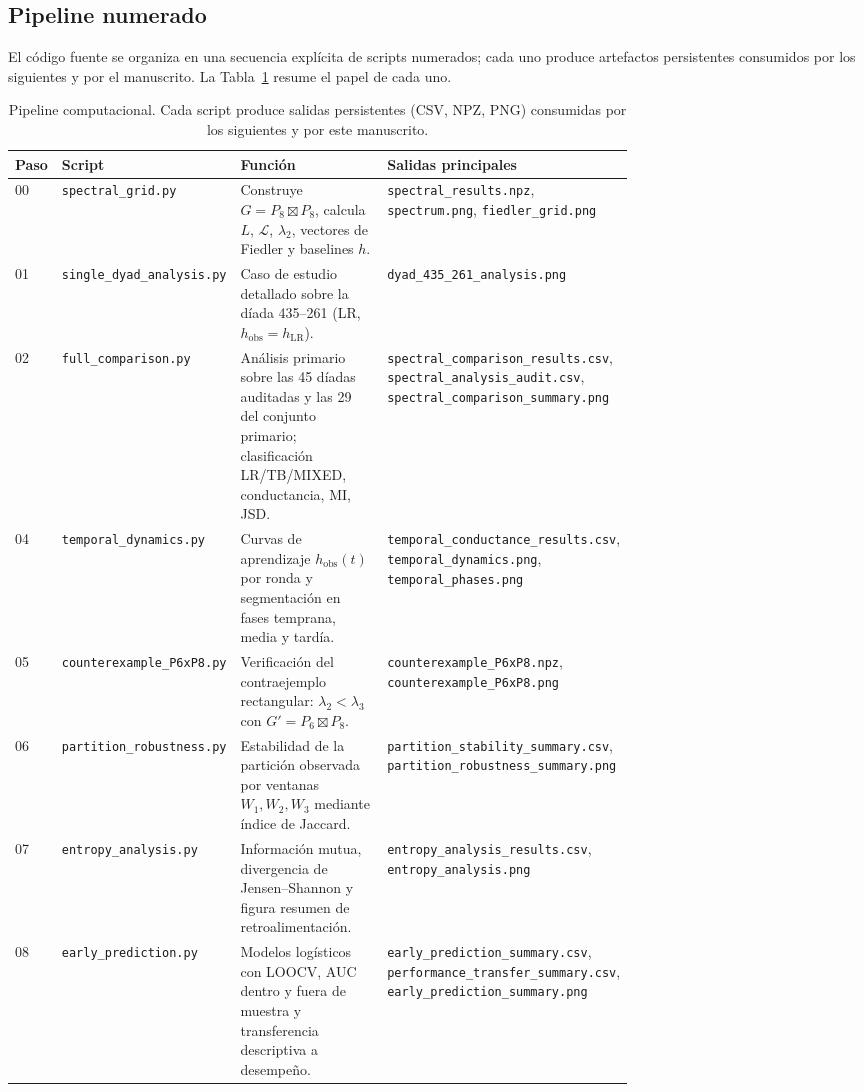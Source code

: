 \documentclass[journal]{IEEEtran}
\begin{document}
\subsection{Pipeline numerado}

El código fuente se organiza en una secuencia explícita de scripts numerados; cada uno produce artefactos persistentes consumidos por los siguientes y por el manuscrito. La Tabla~\ref{tab:pipeline} resume el papel de cada uno.

\begin{table}[t]
\centering
\caption{Pipeline computacional. Cada script produce salidas persistentes (CSV, NPZ, PNG) consumidas por los siguientes y por este manuscrito.}
\label{tab:pipeline}
\begin{tabular}{@{}llp{0.40\linewidth}p{0.32\linewidth}@{}}
\toprule
\textbf{Paso} & \textbf{Script} & \textbf{Función} & \textbf{Salidas principales} \\
\midrule
00 & \texttt{spectral\_grid.py}        & Construye $G = P_8 \boxtimes P_8$, calcula $L$, $\mathcal{L}$, $\lambda_2$, vectores de Fiedler y baselines $h$. & \texttt{spectral\_results.npz}, \texttt{spectrum.png}, \texttt{fiedler\_grid.png} \\
01 & \texttt{single\_dyad\_analysis.py} & Caso de estudio detallado sobre la díada 435--261 (LR, $h_{\mathrm{obs}}=h_{\mathrm{LR}}$). & \texttt{dyad\_435\_261\_analysis.png} \\
02 & \texttt{full\_comparison.py}      & Análisis primario sobre las 45 díadas auditadas y las 29 del conjunto primario; clasificación LR/TB/MIXED, conductancia, MI, JSD. & \texttt{spectral\_comparison\_results.csv}, \texttt{spectral\_analysis\_audit.csv}, \texttt{spectral\_comparison\_summary.png} \\
04 & \texttt{temporal\_dynamics.py}    & Curvas de aprendizaje $h_{\mathrm{obs}}(t)$ por ronda y segmentación en fases temprana, media y tardía. & \texttt{temporal\_conductance\_results.csv}, \texttt{temporal\_dynamics.png}, \texttt{temporal\_phases.png} \\
05 & \texttt{counterexample\_P6xP8.py} & Verificación del contraejemplo rectangular: $\lambda_2 < \lambda_3$ con $G' = P_6 \boxtimes P_8$. & \texttt{counterexample\_P6xP8.npz}, \texttt{counterexample\_P6xP8.png} \\
06 & \texttt{partition\_robustness.py} & Estabilidad de la partición observada por ventanas $W_1, W_2, W_3$ mediante índice de Jaccard. & \texttt{partition\_stability\_summary.csv}, \texttt{partition\_robustness\_summary.png} \\
07 & \texttt{entropy\_analysis.py}     & Información mutua, divergencia de Jensen--Shannon y figura resumen de retroalimentación. & \texttt{entropy\_analysis\_results.csv}, \texttt{entropy\_analysis.png} \\
08 & \texttt{early\_prediction.py}     & Modelos logísticos con LOOCV, AUC dentro y fuera de muestra y transferencia descriptiva a desempeño. & \texttt{early\_prediction\_summary.csv}, \texttt{performance\_transfer\_summary.csv}, \texttt{early\_prediction\_summary.png} \\
\bottomrule
\end{tabular}
\end{table}
\end{document}
